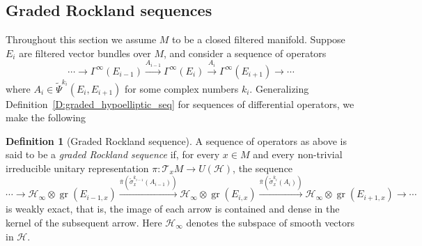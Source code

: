 \documentclass[reqno,12pt]{amsart}
\DeclareMathOperator{\gr}{gr}
\theoremstyle{plain}
\theoremstyle{definition}
\newtheorem{definition}[theorem]{Definition}
\begin{document}
\subsection{Graded Rockland sequences}\label{SS:gRs}





Throughout this section we assume $M$ to be a closed filtered manifold.
Suppose $E_i$ are filtered vector bundles over $M$, and consider a sequence of operators
\begin{equation}\label{E:grRseq}
\cdots\to\Gamma^\infty(E_{i-1})\xrightarrow{A_{i-1}}\Gamma^\infty(E_i)\xrightarrow{A_i}\Gamma^\infty(E_{i+1})\to\cdots
\end{equation}
where $A_i\in\tilde\Psi^{k_i}(E_i,E_{i+1})$ for some complex numbers $k_i$.
Generalizing Definition~\ref{D:graded_hypoelliptic_seq} for sequences of differential operators, we make the following



\begin{definition}[Graded Rockland sequence]\label{D:gRs}
A sequence of operators as above is said to be a \emph{graded Rockland sequence} if, for every $x\in M$ and every non-trivial irreducible unitary representation $\pi\colon\mathcal T_xM\to U(\mathcal H)$, the sequence
$$
\cdots\to\mathcal H_\infty\otimes\gr(E_{{i-1,x}})\xrightarrow{\bar\pi(\tilde\sigma^{k_{i-1}}_x(A_{i-1}))}
\mathcal H_\infty\otimes\gr(E_{i,x})\xrightarrow{\bar\pi(\tilde\sigma^{k_i}_x(A_i))}
\mathcal H_\infty\otimes\gr(E_{i+1,x})\to\cdots
$$
is weakly exact, that is, the image of each arrow is contained and dense in the kernel of the subsequent arrow.
Here $\mathcal H_\infty$ denotes the subspace of smooth vectors in $\mathcal H$.
\end{definition}
\end{document}
